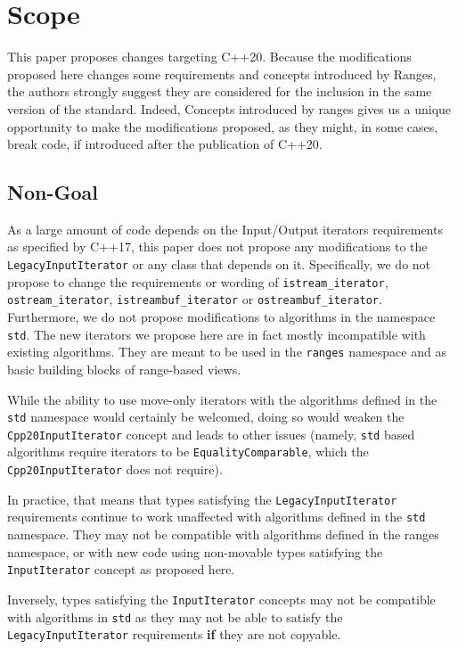 \documentclass{wg21}
\begin{document}
\hypertarget{scope}{%
	\section{Scope}\label{scope}}

This paper proposes changes targeting C++20. Because the modifications
proposed here changes some requirements and concepts introduced by
Ranges, the authors strongly suggest they are considered for the
inclusion in the same version of the standard. Indeed, Concepts
introduced by ranges gives us a unique opportunity to make the
modifications proposed, as they might, in some cases, break code, if
introduced after the publication of C++20.

\hypertarget{non-goal}{%
	\subsection{Non-Goal}\label{non-goal}}

As a large amount of code depends on the Input/Output iterators
requirements as specified by C++17, this paper does not propose any
modifications to the \texttt{LegacyInputIterator} or any class that
depends on it. Specifically, we do not propose to change the
requirements or wording of \texttt{istream\_iterator},
\texttt{ostream\_iterator}, \texttt{istreambuf\_iterator} or
\texttt{ostreambuf\_iterator}. Furthermore, we do not propose
modifications to algorithms in the namespace \texttt{std}. The new
iterators we propose here are in fact mostly incompatible with existing
algorithms. They are meant to be used in the \texttt{ranges} namespace
and as basic building blocks of range-based views.

While the ability to use move-only iterators with the algorithms defined
in the \texttt{std} namespace would certainly be welcomed, doing so
would weaken the \texttt{Cpp20InputIterator} concept and leads to other
issues (namely, \texttt{std} based algorithms require iterators to be
\texttt{EqualityComparable}, which the \texttt{Cpp20InputIterator} does
not require).

In practice, that means that types satisfying the
\texttt{LegacyInputIterator} requirements continue to work unaffected
with algorithms defined in the \texttt{std} namespace. They may not be
compatible with algorithms defined in the ranges namespace, or with new
code using non-movable types satisfying the \texttt{InputIterator}
concept as proposed here.

Inversely, types satisfying the \texttt{InputIterator} concepts may not
be compatible with algorithms in \texttt{std} as they may not be able to
satisfy the \texttt{LegacyInputIterator} requirements \textbf{if} they
are not copyable.
\end{document}
